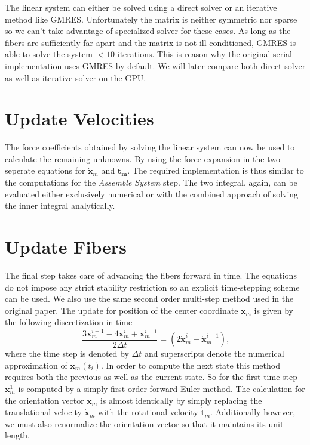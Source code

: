 \documentclass[a4paper,11pt]{kth-mag}
\begin{document}
The linear system can either be solved using a direct solver or an iterative method like GMRES. Unfortunately the matrix is neither symmetric nor sparse so we can't take advantage of specialized solver for these cases. As long as the fibers are sufficiently far apart and the matrix is not ill-conditioned, GMRES is able to solve the system $<10$ iterations. This is reason why the original serial implementation uses GMRES by default. We will later compare both direct solver as well as iterative solver on the GPU.

\section{Update Velocities}

The force coefficients obtained by solving the linear system can now be used to calculate the remaining unknowns. By using the force expansion in the two seperate equations for $\mathbf{\dot{x}}_m$ and $\mathbf{\dot{t}_m}$. The required implementation is thus similar to the computations for the \emph{Assemble System} step. The two integral, again, can be evaluated either exclusively numerical or with the combined approach of solving the inner integral analytically.

\section{Update Fibers}

The final step takes care of advancing the fibers forward in time. The equations do not impose any strict stability restriction so an explicit time-stepping scheme can be used. We also use the same second order multi-step method used in the original paper. The update for position of the center coordinate $\mathbf{x}_m$ is given by the following discretization in time
\begin{equation}
  \label{eq:time_discretization}
  \frac{3\mathbf{x}_m^{i+1} - 4\mathbf{x}_m^{i} + \mathbf{x}_m^{i-1}}{2 \Delta t} = (2\mathbf{\dot{x}}_m^{i} - \mathbf{\dot{x}}_m^{i-1}) \text{,}
\end{equation}
where the time step is denoted by $\Delta t$ and superscripts denote the numerical approximation of $\mathbf{x}_m(t_i)$. In order to compute the next state this method requires both the previous as well as the current state. So for the first time step $\mathbf{x}_{m}^{1}$ is computed by a simply first order forward Euler method. The calculation for the orientation vector $\mathbf{x}_m$ is almost identically by simply replacing the translational velocity $\mathbf{\dot{x}}_m$ with the rotational velocity $\mathbf{\dot{t}}_m$. Additionally however, we must also renormalize the orientation vector so that it maintains its unit length.
\end{document}
